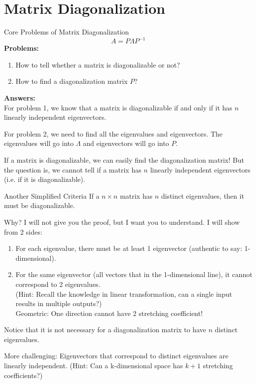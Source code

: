\documentclass{beamer}
\begin{document}
\section{Matrix Diagonalization}
\begin{frame}{Core Problems of Matrix Diagonalization}
    \begin{equation*}
        A=P\varLambda P^{-1}
    \end{equation*}
\textbf{Problems:}
\begin{enumerate}
    \item How to tell whether a matrix is diagonalizable or not?
    \item How to find a diagonalization matrix $P$?
\end{enumerate}

\textbf{Answers:}\\
\vspace{3pt}
For problem 1, we know that a matrix is diagonalizable if and only if it has $n$ linearly independent eigenvectors.

\vspace{3pt}
For problem 2, we need to find all the eigenvalues and eigenvectors. The eigenvalues will go into $\varLambda$ and eigenvectors will go into $P$.

\vspace{5pt}
If a matrix is diagonalizable, we can easily find the diagonalization matrix! But the question is, we cannot tell if a matrix has $n$ linearly independent eigenvectors (i.e. if it is diagonalizable).
\end{frame}

\begin{frame}{Another Simplified Criteria}
If a $n\times n$ matrix has $n$ distinct eigenvalues, then it must be diagonalizable.

\vspace{3pt}
Why? I will not give you the proof, but I want you to understand. I will show from 2 sides:

\begin{enumerate}
    \item For each eigenvalue, there must be at least 1 eigenvector (authentic to say: 1-dimensional).
    \item For the same eigenvector (all vectors that in the 1-dimensional line), it cannot correspond to 2 eigenvalues.\\
    (Hint: Recall the knowledge in linear transformation, can a single input results in multiple outputs?)\\
    Geometric: One direction cannot have 2 stretching coefficient!
\end{enumerate}

Notice that it is not necessary for a diagonalization matrix to have $n$ distinct eigenvalues.

\vspace{3pt}
More challenging: Eigenvectors that correspond to distinct eigenvalues are linearly independent. (Hint: Can a k-dimensional space has $k+1$ stretching coefficients?)

\end{frame}
\end{document}
